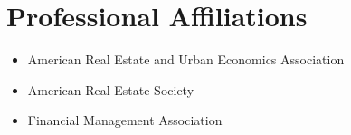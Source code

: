 \documentclass[letterpaper,11pt]{article}
\newcommand{\sectionspacing}{\vspace{-2mm}}
\begin{document}
\section{\textbf{Professional Affiliations}}
\vspace{-0.4mm}
\begin{itemize}[leftmargin=*, labelsep=1mm, itemsep=0.5mm]
    \small
    \item American Real Estate and Urban Economics Association
    \item American Real Estate Society
    \item Financial Management Association
\end{itemize}
\sectionspacing
\end{document}
